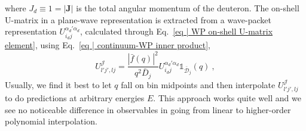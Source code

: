 \documentclass[aps,prc,showpacs,twocolumn,floatfix,nobibnotes,nofootinbib,amsmath,amssymb,longbibliography]{revtex4-2}
\begin{document}
where $J_d\equiv1=|\bm{J}|$ is the total angular momentum of the deuteron. The on-shell U-matrix in a plane-wave 
representation is extracted from a wave-packet representation $U_{i_dj}^{\alpha_d'\alpha_d}$, calculated through Eq.~\eqref{eq | WP on-shell U-matrix element},
 using Eq.~\eqref{eq | continuum-WP inner product},
\begin{equation}
	U_{l'j',lj}^{\mathcal{J}} = \frac{|\bar{f}(q)|^2}{q^2\bar{D}_j}U_{i_dj}^{\alpha_d'\alpha_d}\mathds{1}_{\bar{\mathcal{D}}_j}(q) \:,
\end{equation}
Usually, we find it best to let $q$ fall on bin midpoints and then interpolate $U_{l'j',lj}^{\mathcal{J}}$ to do predictions at arbitrary energies $E$. This approach works quite well and we see no noticeable difference in observables in going from linear to higher-order polynomial interpolation.
\end{document}
